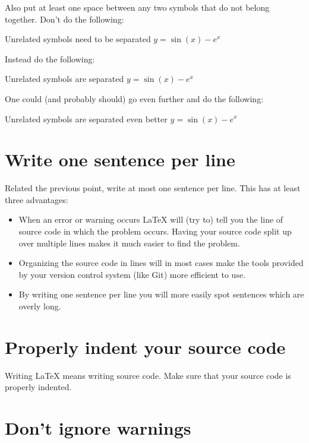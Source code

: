 Also put at least one space between any two symbols that do not belong together.
Don’t do the following:
\begin{showcode}{Unrelated symbols need to be separated}
$y=\sin(x)-e^x$
\end{showcode}
Instead do the following:
\begin{showcode}{Unrelated symbols are separated}
$y = \sin(x) - e^x$
\end{showcode}
One could (and probably should) go even further and do the following:
\begin{showcode}{Unrelated symbols are separated even better}
$y = \sin ( x ) - e^x$
\end{showcode}





\section{Write one sentence per line}

Related the previous point, write at most one sentence per line.
This has at least three advantages:
\begin{itemize}
  \item
    When an error or warning occurs {\LaTeX} will (try to) tell you the line of source code in which the problem occurs.
    Having your source code split up over multiple lines makes it much easier to find the problem.
  \item
    Organizing the source code in lines will in most cases make the tools provided by your version control system (like Git) more efficient to use.
  \item
    By writing one sentence per line you will more easily spot sentences which are overly long.
\end{itemize}





\section{Properly indent your source code}

Writing {\LaTeX} means writing source code.
Make sure that your source code is properly indented.





\section{Don’t ignore warnings}

